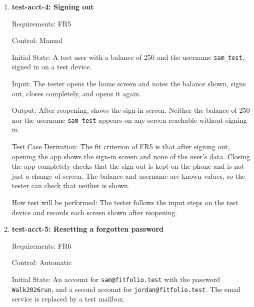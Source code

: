 \documentclass[12pt, titlepage]{article}
\begin{document}
\begin{enumerate}
Test Case Derivation: FR3 asks a user who chooses a username already in use to
choose a different one, and compares usernames without regard to case, so
\texttt{Sam\_Test} is also in use. This stops a look-alike username from being
used to impersonate someone. FR3 stores usernames as entered, so the capitals
in \texttt{Jordan\_Test} are kept. FR1 refuses an email address already in use.
The last request combines details from the earlier ones, so it shows that each
refusal was caused by the one detail already in use.

How test will be performed: A pytest test sends the four requests and checks
each response, which accounts exist afterwards, and the stored username.

\item{\textbf{test-acct-4: Signing out}\\}

Requirements: FR5

Control: Manual

Initial State: A test user with a balance of 250 and the username
\texttt{sam\_test}, signed in on a test device.

Input: The tester opens the home screen and notes the balance shown, signs
out, closes \progname{} completely, and opens it again.

Output: After reopening, \progname{} shows the sign-in screen. Neither the
balance of 250 nor the username \texttt{sam\_test} appears on any screen
reachable without signing in.

Test Case Derivation: The fit criterion of FR5 is that after signing out,
opening the app shows the sign-in screen and none of the user's data. Closing
the app completely checks that the sign-out is kept on the phone and is not
just a change of screen. The balance and username are known values, so the
tester can check that neither is shown.

How test will be performed: The tester follows the input steps on the test
device and records each screen shown after reopening.

\item{\textbf{test-acct-5: Resetting a forgotten password}\\}

Requirements: FR6

Control: Automatic

Initial State: An account for \texttt{sam@fitfolio.test} with the password
\texttt{Walk2026run}, and a second account for \texttt{jordan@fitfolio.test}.
The email service is replaced by a test mailbox.


\end{enumerate}
\end{document}
